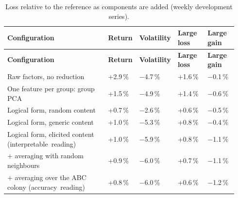 {\scriptsize\setlength{\tabcolsep}{4pt}\renewcommand{\arraystretch}{1.2}
\begin{longtable}{@{}>{\raggedright\arraybackslash}p{0.448\linewidth}>{\raggedleft\arraybackslash}p{0.090\linewidth}>{\raggedleft\arraybackslash}p{0.133\linewidth}>{\raggedleft\arraybackslash}p{0.133\linewidth}>{\raggedleft\arraybackslash}p{0.133\linewidth}@{}}
\caption{Loss relative to the reference as components are added (weekly development series).}\label{tab:D1}\\
\toprule
\textbf{Configuration} & \textbf{Return} & \textbf{Volatility} & \textbf{Large loss} & \textbf{Large gain} \\
\midrule
\endfirsthead
\toprule
\textbf{Configuration} & \textbf{Return} & \textbf{Volatility} & \textbf{Large loss} & \textbf{Large gain} \\
\midrule
\endhead
\bottomrule
\endlastfoot
Raw factors, no reduction & +2.9\,\% & \ensuremath{-}4.7\,\% & +1.6\,\% & \ensuremath{-}0.1\,\% \\
One feature per group: group PCA & +1.5\,\% & \ensuremath{-}4.9\,\% & +1.4\,\% & \ensuremath{-}0.6\,\% \\
Logical form, random content & +0.7\,\% & \ensuremath{-}2.6\,\% & +0.6\,\% & \ensuremath{-}0.5\,\% \\
Logical form, generic content & +1.0\,\% & \ensuremath{-}5.3\,\% & +0.8\,\% & \ensuremath{-}0.4\,\% \\
Logical form, elicited content (interpretable~reading) & +1.0\,\% & \ensuremath{-}5.9\,\% & +0.8\,\% & \ensuremath{-}1.1\,\% \\
+ averaging with random neighbours & +0.9\,\% & \ensuremath{-}6.0\,\% & +0.7\,\% & \ensuremath{-}1.1\,\% \\
+ averaging over the ABC colony (accuracy~reading) & +0.8\,\% & \ensuremath{-}6.0\,\% & +0.6\,\% & \ensuremath{-}1.2\,\% \\
\end{longtable}}

